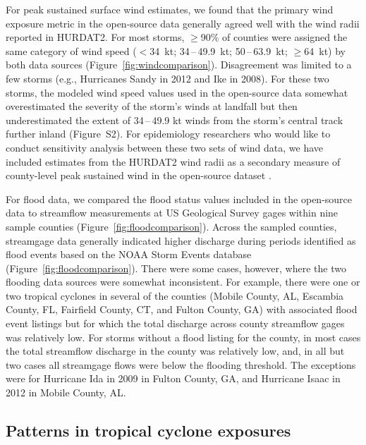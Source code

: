 For peak sustained surface wind estimates, we found that the primary wind
exposure metric in the open-source data generally agreed well with the wind
radii reported in \ac{HURDAT2}. For most storms, $\ge$90\% of counties were
assigned the same category of wind speed ($<$34~kt; 34\,--\,49.9~kt;
50\,--\,63.9~kt; $\ge$64~kt) by both data sources
(Figure~\ref{fig:windcomparison}).  Disagreement was limited to a few storms
(e.g., Hurricanes Sandy in 2012 and Ike in 2008). For these two storms, the
modeled wind speed values used in the open-source data somewhat overestimated
the severity of the storm's winds at landfall but then underestimated the
extent of 34\,--\,49.9 kt winds from the storm's central track further inland
(Figure~S2). For epidemiology researchers who would like to conduct sensitivity
analysis between these two sets of wind data, we have included estimates from
the \ac{HURDAT2} wind radii as a secondary measure of county-level peak
sustained wind in the open-source dataset \parencite{hurricaneexposuredata}.

For flood data, we compared the flood status values included in the open-source
data to streamflow measurements at \ac{US} Geological Survey gages within nine
sample counties (Figure~\ref{fig:floodcomparison}). Across the sampled
counties, streamgage data generally indicated higher discharge during periods
identified as flood events based on the NOAA Storm Events database
(Figure~\ref{fig:floodcomparison}). There were some cases, however, where the
two flooding data sources were somewhat inconsistent.  For example, there were
one or two tropical cyclones in several of the counties (Mobile County, AL,
Escambia County, FL, Fairfield County, CT, and Fulton County, GA) with
associated flood event listings but for which the total discharge across county
streamflow gages was relatively low. For storms without a flood listing for the
county, in most cases the total streamflow discharge in the county was
relatively low, and, in all but two cases all streamgage flows were
below the flooding threshold. The exceptions were for Hurricane Ida in 2009 in
Fulton County, GA, and Hurricane Isaac in 2012 in Mobile County, AL. 

\subsection*{Patterns in tropical cyclone exposures}

